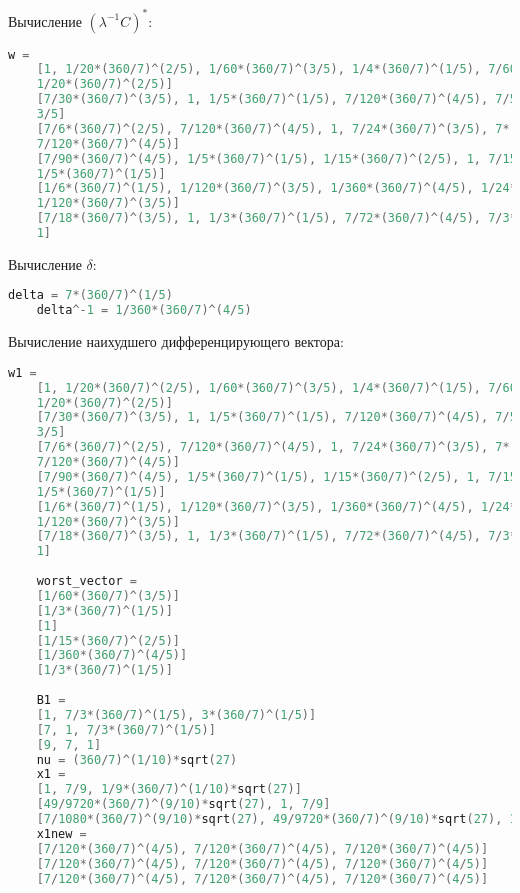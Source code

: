 \documentclass[specialist,
  substylefile = spbu.rtx,
  href,
  colorlinks=true,
  12pt]{disser}
\begin{document}
	Вычисление $(\lambda^{-1}C)^*$:
\begin{lstlisting}[language=c++,basicstyle=\scriptsize\ttfamily]
	w = 
	[1, 1/20*(360/7)^(2/5), 1/60*(360/7)^(3/5), 1/4*(360/7)^(1/5), 7/60*(360/7)^(4/5), 
	1/20*(360/7)^(2/5)]
	[7/30*(360/7)^(3/5), 1, 1/5*(360/7)^(1/5), 7/120*(360/7)^(4/5), 7/5*(360/7)^(2/5), 
	3/5]
	[7/6*(360/7)^(2/5), 7/120*(360/7)^(4/5), 1, 7/24*(360/7)^(3/5), 7*(360/7)^(1/5), 
	7/120*(360/7)^(4/5)]
	[7/90*(360/7)^(4/5), 1/5*(360/7)^(1/5), 1/15*(360/7)^(2/5), 1, 7/15*(360/7)^(3/5), 
	1/5*(360/7)^(1/5)]
	[1/6*(360/7)^(1/5), 1/120*(360/7)^(3/5), 1/360*(360/7)^(4/5), 1/24*(360/7)^(2/5), 1, 
	1/120*(360/7)^(3/5)]
	[7/18*(360/7)^(3/5), 1, 1/3*(360/7)^(1/5), 7/72*(360/7)^(4/5), 7/3*(360/7)^(2/5), 
	1]
\end{lstlisting}
	
	Вычисление $\delta$:
\begin{lstlisting}[language=c++,basicstyle=\footnotesize\ttfamily]
	delta = 7*(360/7)^(1/5)
	delta^-1 = 1/360*(360/7)^(4/5)
\end{lstlisting}
	Вычисление наихудшего дифференцирующего вектора:
	\begin{lstlisting}[language=c++,basicstyle=\scriptsize\ttfamily]
	w1 = 
	[1, 1/20*(360/7)^(2/5), 1/60*(360/7)^(3/5), 1/4*(360/7)^(1/5), 7/60*(360/7)^(4/5), 
	1/20*(360/7)^(2/5)]
	[7/30*(360/7)^(3/5), 1, 1/5*(360/7)^(1/5), 7/120*(360/7)^(4/5), 7/5*(360/7)^(2/5), 
	3/5]
	[7/6*(360/7)^(2/5), 7/120*(360/7)^(4/5), 1, 7/24*(360/7)^(3/5), 7*(360/7)^(1/5), 
	7/120*(360/7)^(4/5)]
	[7/90*(360/7)^(4/5), 1/5*(360/7)^(1/5), 1/15*(360/7)^(2/5), 1, 7/15*(360/7)^(3/5), 
	1/5*(360/7)^(1/5)]
	[1/6*(360/7)^(1/5), 1/120*(360/7)^(3/5), 1/360*(360/7)^(4/5), 1/24*(360/7)^(2/5), 1, 
	1/120*(360/7)^(3/5)]
	[7/18*(360/7)^(3/5), 1, 1/3*(360/7)^(1/5), 7/72*(360/7)^(4/5), 7/3*(360/7)^(2/5), 
	1]
	
	worst_vector = 
	[1/60*(360/7)^(3/5)]
	[1/3*(360/7)^(1/5)]
	[1]
	[1/15*(360/7)^(2/5)]
	[1/360*(360/7)^(4/5)]
	[1/3*(360/7)^(1/5)]
	
	B1 = 
	[1, 7/3*(360/7)^(1/5), 3*(360/7)^(1/5)]
	[7, 1, 7/3*(360/7)^(1/5)]
	[9, 7, 1]
	nu = (360/7)^(1/10)*sqrt(27)
	x1 = 
	[1, 7/9, 1/9*(360/7)^(1/10)*sqrt(27)]
	[49/9720*(360/7)^(9/10)*sqrt(27), 1, 7/9]
	[7/1080*(360/7)^(9/10)*sqrt(27), 49/9720*(360/7)^(9/10)*sqrt(27), 1]
	x1new = 
	[7/120*(360/7)^(4/5), 7/120*(360/7)^(4/5), 7/120*(360/7)^(4/5)]
	[7/120*(360/7)^(4/5), 7/120*(360/7)^(4/5), 7/120*(360/7)^(4/5)]
	[7/120*(360/7)^(4/5), 7/120*(360/7)^(4/5), 7/120*(360/7)^(4/5)]
\end{lstlisting}
\end{document}
